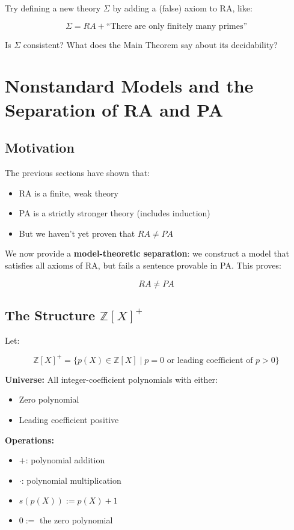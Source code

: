 \documentclass[12pt]{article}
\begin{document}
Try defining a new theory \( \Sigma \) by adding a (false) axiom to RA, like:

\[
\Sigma = RA + \text{“There are only finitely many primes”}
\]

Is \( \Sigma \) consistent? What does the Main Theorem say about its decidability?

\section{Nonstandard Models and the Separation of RA and PA}

\subsection{Motivation}

The previous sections have shown that:

\begin{itemize}
  \item RA is a finite, weak theory
  \item PA is a strictly stronger theory (includes induction)
  \item But we haven't yet proven that \( RA \neq PA \)
\end{itemize}

We now provide a \textbf{model-theoretic separation}: we construct a model that satisfies all axioms of RA, but fails a sentence provable in PA. This proves:

\[
RA \neq PA
\]

\subsection{The Structure \( \mathbb{Z}[X]^+ \)}

Let:

\[
\mathbb{Z}[X]^+ = \{ p(X) \in \mathbb{Z}[X] \mid p = 0 \text{ or leading coefficient of } p > 0 \}
\]

\textbf{Universe:} All integer-coefficient polynomials with either:
\begin{itemize}
  \item Zero polynomial
  \item Leading coefficient positive
\end{itemize}

\textbf{Operations:}

\begin{itemize}
  \item \( + \): polynomial addition
  \item \( \cdot \): polynomial multiplication
  \item \( s(p(X)) := p(X) + 1 \)
  \item \( 0 := \) the zero polynomial
\end{itemize}
\end{document}
